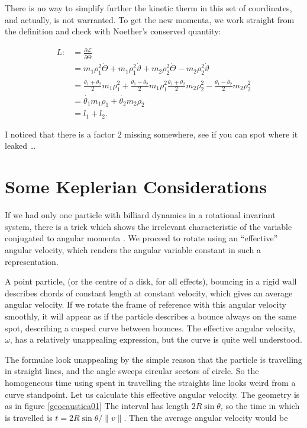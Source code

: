 \documentclass[letterpaperr,12pt]{article}
\newcommand{\Lagr}{\mathcal{L}\xspace}
\begin{document}
There is no way to simplify further the kinetic therm in this
set of coordinates, and actually, is not warranted.
To get the new momenta, we work straight from the
definition and check with Noether's conserved quantity:

\begin{equation}
\begin{split}
L : & = \frac{\partial \Lagr}{\partial \dot{\Theta}} \\
&=m_1\rho_1^2\dot{\Theta}+m_1\rho_1^2\dot{\vartheta}
+m_2\rho_2^2\dot{\Theta}-m_2\rho_2^2\dot{\vartheta} \\
&=\frac{\dot{\theta_1}+\dot{\theta_2}}{2}m_1\rho_1^2+
\frac{\dot{\theta_1}-\dot{\theta_2}}{2}m_1\rho_1^2
\frac{\dot{\theta_1}+\dot{\theta_2}}{2}m_2\rho_2^2-
\frac{\dot{\theta_1}-\dot{\theta_2}}{2}m_2\rho_2^2 \\
&= \dot{\theta_1} m_1 \rho_1+\dot{\theta_2} m_2 \rho_2 \\
& = l_1+l_2.
\end{split}
\end{equation}

I noticed that there is a factor $2$ missing somewhere,
see if you can spot where it leaked  \ldots



\section{Some Keplerian Considerations}

If we had only one particle with billiard dynamics in a rotational
invariant system,  there is a trick which shows the irrelevant characteristic
of the variable conjugated to angular momenta \cite{Benet}.
We proceed to rotate using an ``effective'' angular velocity, which
renders the angular variable constant in such a representation.

A point particle, (or the centre of a disk, for all effects), bouncing
in a rigid wall describes chords of constant length at constant velocity,
which gives an average angular velocity. If we rotate the frame of
reference with this angular velocity smoothly, it will appear as if
the particle describes a bounce always on the same spot, describing
a cusped curve between bounces. The effective angular
velocity, $\omega$, has a relatively unappealing expression, but the
curve is quite well understood. 

The formulae look unappealing by the simple reason that
the particle is travelling in straight lines, and the angle sweeps
circular sectors of circle. So the homogeneous time using
spent in travelling the straights line looks weird from a curve 
standpoint. 
Let us calculate this effective angular velocity.
The geometry is as in figure \ref{geocaustica01}
The interval has length  $ 2 R \sin \theta$, so the
time in which is travelled is $ t= 2 R \sin \theta/\|v\|$.
Then the average angular velocity would be
\end{document}
